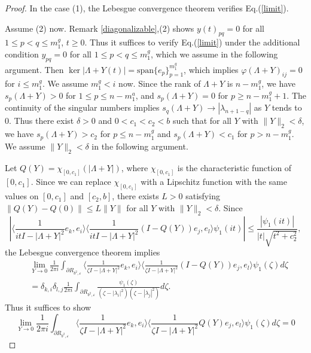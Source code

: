\documentclass[12pt]{article}
\theoremstyle{definition}
\numberwithin{equation}{section}
\newcommand{\inpr}[2]{\langle{#1,#2}\rangle}
\begin{document}
\begin{proof}
In the case (1), the Lebesgue convergence theorem verifies Eq.(\ref{limit}). 

Assume (2) now. 
Remark \ref{diagonalizable},(2) shows $y(t)_{pq}=0$ for all $1\leq p<q\leq m^g_1$, $t\geq 0$. 
Thus it suffices to verify  Eq.(\ref{limit}) under the additional condition $y_{pq}=0$ 
for all $1\leq p<q\leq m^g_1$, which we assume in the following argument.  
Then $\ker|\Lambda+Y(t)|=\mathrm{span}\{e_p\}_{p=1}^{m^g_1}$, which implies $\varphi(\Lambda+Y)_{ij}=0$ 
for $i\leq m^g_1$. 
We assume $m^g_1< i$ now. 
Since the rank of $\Lambda+Y$ is $n-m^g_1$, we have $s_p(\Lambda+Y)>0$ for $1\leq p\leq n-m^a_1$, 
and $s_p(\Lambda+Y)=0$ for $p\geq n-m^g_1+1$. 
The continuity of the singular numbers implies $s_q(\Lambda+Y)\to |\lambda_{n+1-q}|$ as $Y$ tends to 0. 
Thus there exist $\delta>0$ and $0<c_1<c_2<b$ such that for all $Y$ with $\|Y\|_2<\delta$, we have 
$s_p(\Lambda+Y)>c_2$ for $p\leq n-m^g_1$ and $s_p(\Lambda+Y)<c_1$ for $p>n-m^g_1$. 
We assume $\|Y\|_2<\delta$ in the following argument. 

Let $Q(Y)=\chi_{[0,c_1]}(|\Lambda+Y|)$, where $\chi_{[0,c_1]}$ is the characteristic function of $[0,c_1]$. 
Since we can replace $\chi_{[0,c_1]}$ with a Lipschitz function with the same values on $[0,c_1]$ and $[c_2,b]$, 
there exists $L>0$ satisfying $\|Q(Y)-Q(0)\|\leq L\|Y\|$ for all $Y$ with $\|Y\|_2<\delta$. 
Since 
\[|\inpr{\frac{1}{it I-|\Lambda+Y|^2} e_k}{e_i}\inpr{\frac{1}{it I-|\Lambda+Y|^2}(I-Q(Y)) e_j}{e_l}\psi_1(it)|
\leq \frac{|\psi_1(it)|}{|t|\sqrt{t^2+c_2^2}}, \]
the Lebesgue convergence theorem implies  
\begin{align*}
	&\lim_{Y\to 0}
	\frac{1}{2\pi i}\int_{\partial R_{b^2,\varepsilon}} \inpr{\frac{1}{\zeta I-|\Lambda+Y|^2} e_k}{e_i}\inpr{\frac{1}{\zeta I-|\Lambda+Y|^2}(I-Q(Y)) e_j}{e_l}	\psi_1(\zeta)d\zeta\\ \nonumber
	&=\delta_{k,i}\delta_{l,j}\frac{1}{2\pi i}\int_{\partial R_{b^2,\varepsilon}}\frac{\psi_1(\zeta)}{(\zeta-|\lambda_i|^2)(\zeta-|\lambda_j|^2)}d\zeta. 
\end{align*}
Thus it suffices to show 
\[\lim_{Y\to 0}
	\frac{1}{2\pi i}\int_{\partial R_{b^2,\varepsilon}} \inpr{\frac{1}{\zeta I-|\Lambda+Y|^2} e_k}{e_i}\inpr{\frac{1}{\zeta I-|\Lambda+Y|^2}Q(Y)e_j}{e_l}	\psi_1(\zeta)d\zeta=0\]
	

\end{proof}
\end{document}
